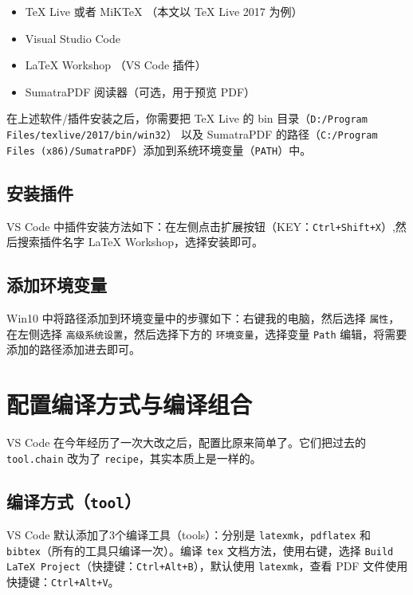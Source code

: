 \documentclass{article}
\begin{document}
\begin{itemize}
\item TeX Live 或者 MiKTeX （本文以 TeX Live 2017 为例）
\item Visual Studio Code
\item LaTeX Workshop （VS Code 插件）
\item SumatraPDF 阅读器（可选，用于预览 PDF）
\end{itemize}


在上述软件/插件安装之后，你需要把 TeX Live 的 bin 目录（\texttt{D:/Program Files/texlive/2017/bin/win32}） 以及 SumatraPDF 的路径（\texttt{C:/Program Files (x86)/SumatraPDF}）添加到系统环境变量（\texttt{PATH}）中。


\subsection{安装插件}
VS Code 中插件安装方法如下：在左侧点击扩展按钮（KEY：\texttt{Ctrl+Shift+X}）,然后搜索插件名字 LaTeX Workshop，选择安装即可。

\subsection{添加环境变量}
Win10 中将路径添加到环境变量中的步骤如下：右键我的电脑，然后选择 \texttt{属性}，在左侧选择 \texttt{高级系统设置}，然后选择下方的 \texttt{环境变量}，选择变量 \texttt{Path} 编辑，将需要添加的路径添加进去即可。

\section{配置编译方式与编译组合}
VS Code 在今年经历了一次大改之后，配置比原来简单了。它们把过去的 \texttt{tool.chain} 改为了 \texttt{recipe}，其实本质上是一样的。

\subsection{编译方式（\texttt{tool}）}
VS Code 默认添加了3个编译工具（tools）：分别是 \texttt{latexmk}，\texttt{pdflatex} 和 \texttt{bibtex}（所有的工具只编译一次）。编译 \texttt{tex} 文档方法，使用右键，选择 \texttt{Build LaTeX Project}（快捷键：\texttt{Ctrl+Alt+B}），默认使用 \texttt{latexmk}，查看 PDF 文件使用快捷键：\texttt{Ctrl+Alt+V}。
\end{document}
